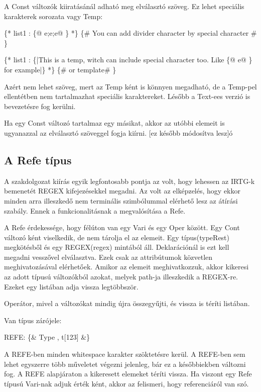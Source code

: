 A Const változók kiiratásánál adható meg elválasztó szöveg.
Ez lehet speciális karakterek sorozata vagy Temp:

\{* list1 : \{@ e;e;e@ \} *\} \{\# You can add divider character by special character \#  \}

\{* list1 : \{|This is a temp, witch can include special character too. Like \{@ e@ \} for example|\} *\} \{\# or template\# \}

Azért nem lehet szöveg, mert az Temp ként is könnyen megadható, de a Temp-pel ellentétben nem tartalmazhat speciális karaktereket.
Lésőbb a Text-ees verzió is bevezetésre fog kerülni.

Ha egy Const változó tartalmaz egy másikat, akkor az utóbbi elemeit is ugyanazzal az elválasztó szöveggel fogja kiírni. 
[ez később módosítva lesz]ó

\subsection{A Refe típus}

A szakdolgozat kiírás egyik legfontosabb pontja az volt, hogy lehessen az IRTG-k bemenetét REGEX kifejezésekkel megadni.
Az volt az elképzelés, hogy ekkor minden arra illeszkedő nem terminális szimbólummal elérhető lesz az átírási szabály.
Ennek a funkcionalitásnak a megvalósítása a Refe.

A Refe érdekessége, hogy félúton van egy Vari és egy Oper között.
Egy Cont változó ként viselkedik, de nem tárolja el az elemeit.
Egy típus(typeRest) megkötésből és egy REGEX(regex) mintából áll.
Deklarációnál is ezt kell megadni vesszővel elválasztva.
Ezek csak az attribútumok közvetlen meghivatozásával elérhetőek.
Amikor az elemeit meghivatkozzuk, akkor kikeresi az adott típusú változókból azokat,
melyek path-ja illeszkedik a REGEX-re.
Ezeket egy listában adja vissza legtöbbször.

Operátor, mivel a változókat mindig újra összegyűjti, és vissza is téríti listában.

Van típus zárójele:

REFE: \{\& Type , t[123] \&\}

A REFE-ben minden whitespace karakter szöktetésre kerül.
A REFE-ben sem lehet egyszerre több műveletet végezni jelenleg, bár ez a későbbiekben változni fog.
A REFE alapjáraton a kikeresett elemeket téríti vissza.
Ha viszont egy Refe típusú Vari-nak adjuk érték ként, akkor az felismeri, hogy referenciáról van szó.

